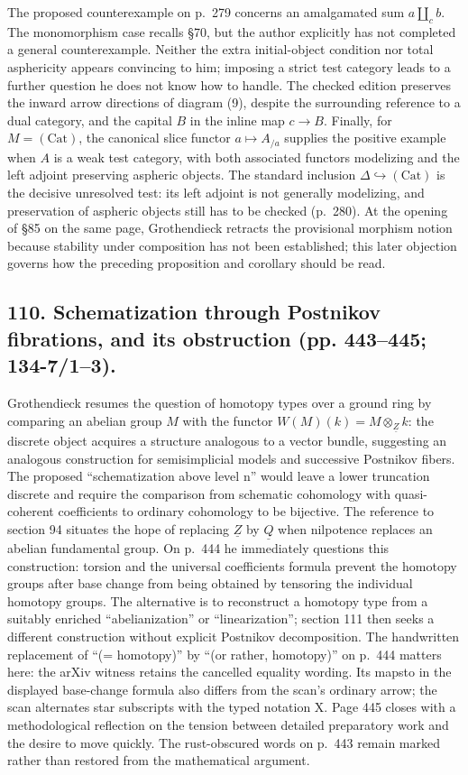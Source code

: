 \documentclass[10pt,oneside]{book}
\begin{document}
The proposed counterexample on p.\ 279 concerns an amalgamated sum $a\amalg_c b$. The monomorphism case recalls \S70, but the author explicitly has not completed a general counterexample. Neither the extra initial-object condition nor total asphericity appears convincing to him; imposing a strict test category leads to a further question he does not know how to handle. The checked edition preserves the inward arrow directions of diagram (9), despite the surrounding reference to a dual category, and the capital $B$ in the inline map $c\to B$. Finally, for $M=(\mathrm{Cat})$, the canonical slice functor $a\mapsto A_{/a}$ supplies the positive example when $A$ is a weak test category, with both associated functors modelizing and the left adjoint preserving aspheric objects. The standard inclusion $\Delta\hookrightarrow(\mathrm{Cat})$ is the decisive unresolved test: its left adjoint is not generally modelizing, and preservation of aspheric objects still has to be checked (p.\ 280). At the opening of \S85 on the same page, Grothendieck retracts the provisional morphism notion because stability under composition has not been established; this later objection governs how the preceding proposition and corollary should be read.

\subsection*{110. Schematization through Postnikov fibrations, and its obstruction (pp. 443--445; 134-7/1--3).}
Grothendieck resumes the question of homotopy types over a ground ring by comparing an abelian group $M$ with the functor $W(M)(k)=M\otimes_{\underline Z}k$: the discrete object acquires a structure analogous to a vector bundle, suggesting an analogous construction for semisimplicial models and successive Postnikov fibers. The proposed ``schematization above level n'' would leave a lower truncation discrete and require the comparison from schematic cohomology with quasi-coherent coefficients to ordinary cohomology to be bijective. The reference to section 94 situates the hope of replacing $\underline Z$ by $\underline Q$ when nilpotence replaces an abelian fundamental group. On p.~444 he immediately questions this construction: torsion and the universal coefficients formula prevent the homotopy groups after base change from being obtained by tensoring the individual homotopy groups. The alternative is to reconstruct a homotopy type from a suitably enriched ``abelianization'' or ``linearization''; section 111 then seeks a different construction without explicit Postnikov decomposition. The handwritten replacement of ``(= homotopy)'' by ``(or rather, homotopy)'' on p.~444 matters here: the arXiv witness retains the cancelled equality wording. Its mapsto in the displayed base-change formula also differs from the scan's ordinary arrow; the scan alternates star subscripts with the typed notation X. Page 445 closes with a methodological reflection on the tension between detailed preparatory work and the desire to move quickly. The rust-obscured words on p.~443 remain marked rather than restored from the mathematical argument.
\end{document}
